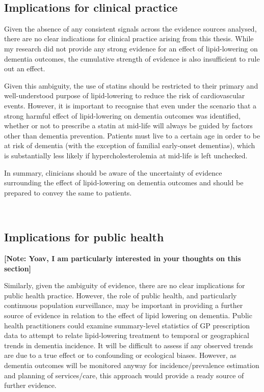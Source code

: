 \documentclass[a4paper, twoside]{templates/ociamthesis}
\begin{document}
~

\hypertarget{implications-for-clinical-practice}{%
\subsection{Implications for clinical practice}\label{implications-for-clinical-practice}}

Given the absence of any consistent signals across the evidence sources analysed, there are no clear indications for clinical practice arising from this thesis. While my research did not provide any strong evidence for an effect of lipid-lowering on dementia outcomes, the cumulative strength of evidence is also insufficient to rule out an effect.

Given this ambiguity, the use of statins should be restricted to their primary and well-understood purpose of lipid-lowering to reduce the risk of cardiovascular events. However, it is important to recognise that even under the scenario that a strong harmful effect of lipid-lowering on dementia outcomes was identified, whether or not to prescribe a statin at mid-life will always be guided by factors other than dementia prevention. Patients must live to a certain age in order to be at risk of dementia (with the exception of familial early-onset dementias), which is substantially less likely if hypercholesterolemia at mid-life is left unchecked.

In summary, clinicians should be aware of the uncertainty of evidence surrounding the effect of lipid-lowering on dementia outcomes and should be prepared to convey the same to patients.

~

\hypertarget{implications-for-public-health}{%
\subsection{Implications for public health}\label{implications-for-public-health}}

\textbf{{[}Note: Yoav, I am particularly interested in your thoughts on this section{]}}

Similarly, given the ambiguity of evidence, there are no clear implications for public health practice. However, the role of public health, and particularly continuous population surveillance, may be important in providing a further source of evidence in relation to the effect of lipid lowering on dementia. Public health practitioners could examine summary-level statistics of GP prescription data to attempt to relate lipid-lowering treatment to temporal or geographical trends in dementia incidence. It will be difficult to assess if any observed trends are due to a true effect or to confounding or ecological biases. However, as dementia outcomes will be monitored anyway for incidence/prevalence estimation and planning of services/care, this approach would provide a ready source of further evidence.
\end{document}
